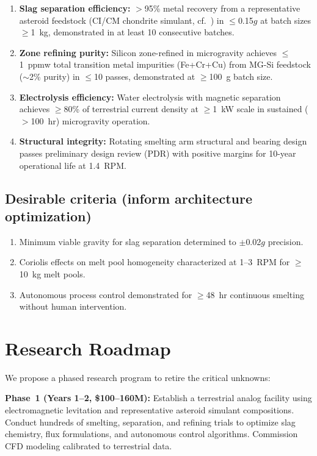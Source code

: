 \documentclass[preprint,12pt]{elsarticle}
\begin{document}
\begin{enumerate}
    \item \textbf{Slag separation efficiency:} $>$95\% metal recovery from a representative asteroid feedstock (CI/CM chondrite simulant, cf.\ \cite{lauretta2024}) in $\leq$0.15$g$ at batch sizes $\geq$1~kg, demonstrated in at least 10 consecutive batches.
    \item \textbf{Zone refining purity:} Silicon zone-refined in microgravity achieves $\leq$1~ppmw total transition metal impurities (Fe+Cr+Cu) from MG-Si feedstock ($\sim$2\% purity) in $\leq$10 passes, demonstrated at $\geq$100~g batch size.
    \item \textbf{Electrolysis efficiency:} Water electrolysis with magnetic separation achieves $\geq$80\% of terrestrial current density at $\geq$1~kW scale in sustained ($>$100~hr) microgravity operation.
    \item \textbf{Structural integrity:} Rotating smelting arm structural and bearing design passes preliminary design review (PDR) with positive margins for 10-year operational life at 1.4~RPM.
\end{enumerate}

\subsection{Desirable criteria (inform architecture optimization)}

\begin{enumerate}
    \item Minimum viable gravity for slag separation determined to $\pm$0.02$g$ precision.
    \item Coriolis effects on melt pool homogeneity characterized at 1--3~RPM for $\geq$10~kg melt pools.
    \item Autonomous process control demonstrated for $\geq$48~hr continuous smelting without human intervention.
\end{enumerate}

\section{Research Roadmap}
\label{sec:roadmap}

We propose a phased research program to retire the critical unknowns:

\textbf{Phase~1 (Years 1--2, \$100--160M):} Establish a terrestrial analog facility using electromagnetic levitation and representative asteroid simulant compositions. Conduct hundreds of smelting, separation, and refining trials to optimize slag chemistry, flux formulations, and autonomous control algorithms. Commission CFD modeling calibrated to terrestrial data.
\end{document}
